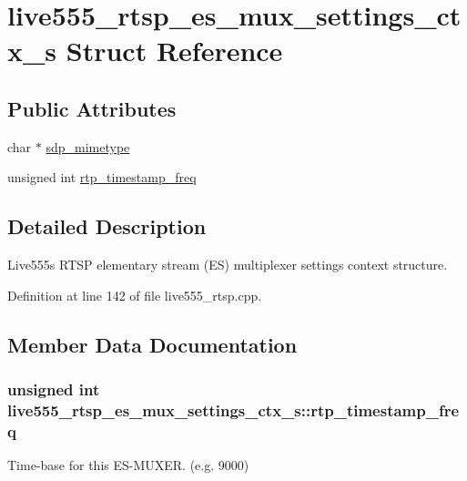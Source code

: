 \hypertarget{structlive555__rtsp__es__mux__settings__ctx__s}{}\section{live555\+\_\+rtsp\+\_\+es\+\_\+mux\+\_\+settings\+\_\+ctx\+\_\+s Struct Reference}
\label{structlive555__rtsp__es__mux__settings__ctx__s}
\subsection*{Public Attributes}
\begin{DoxyCompactItemize}
\item 
char $\ast$ \hyperlink{structlive555__rtsp__es__mux__settings__ctx__s_add4d54b5d2dcca3713bf3bcaebd83539}{sdp\+\_\+mimetype}
\item 
unsigned int \hyperlink{structlive555__rtsp__es__mux__settings__ctx__s_a7654f34c2a102b20269f801b6e8bd8e4}{rtp\+\_\+timestamp\+\_\+freq}
\end{DoxyCompactItemize}


\subsection{Detailed Description}
Live555\textquotesingle{}s R\+T\+SP elementary stream (ES) multiplexer settings context structure. 

Definition at line 142 of file live555\+\_\+rtsp.\+cpp.



\subsection{Member Data Documentation}
\subsubsection[{\texorpdfstring{rtp\+\_\+timestamp\+\_\+freq}{rtp_timestamp_freq}}]{\setlength{\rightskip}{0pt plus 5cm}unsigned int live555\+\_\+rtsp\+\_\+es\+\_\+mux\+\_\+settings\+\_\+ctx\+\_\+s\+::rtp\+\_\+timestamp\+\_\+freq}\hypertarget{structlive555__rtsp__es__mux__settings__ctx__s_a7654f34c2a102b20269f801b6e8bd8e4}{}\label{structlive555__rtsp__es__mux__settings__ctx__s_a7654f34c2a102b20269f801b6e8bd8e4}
Time-\/base for this E\+S-\/\+M\+U\+X\+ER. (e.\+g. 9000) 

